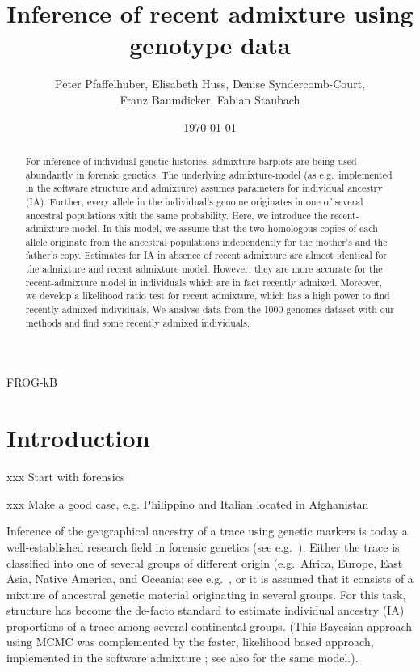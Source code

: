 \documentclass[12pt]{article}
\theoremstyle{definition}
\begin{document}
\title{\LARGE Inference of recent admixture using genotype data}

\author{\sc Peter Pfaffelhuber, Elisabeth Huss, Denise
  Syndercomb-Court, \\ \sc Franz Baumdicker, Fabian Staubach}

\date{\today}

\maketitle

FROG-kB




\begin{abstract}
  For inference of individual genetic histories, admixture barplots
  are being used abundantly in forensic genetics. The underlying
  admixture-model (as e.g.\ implemented in the software {\sc
    structure} and {\sc admixture}) assumes parameters for individual
  ancestry (IA). Further, every allele in the individual's genome
  originates in one of several ancestral populations with the same
  probability. Here, we introduce the recent-admixture model. In this
  model, we assume that the two homologous copies of each allele
  originate from the ancestral populations independently for the
  mother's and the father's copy. Estimates for IA in absence of
  recent admixture are almost identical for the admixture and recent
  admixture model. However, they are more accurate for the
  recent-admixture model in individuals which are in fact recently
  admixed.  Moreover, we develop a likelihood ratio test for recent
  admixture, which has a high power to find recently admixed
  individuals. We analyse data from the 1000 genomes dataset with our
  methods and find some recently admixed individuals.
\end{abstract}

\section{Introduction}
xxx Start with forensics

xxx Make a good case, e.g. Philippino and Italian located in
Afghanistan

Inference of the geographical ancestry of a trace using genetic
markers is today a well-established research field in forensic
genetics (see e.g.\ \cite{Phillips2016, Eduardoff2016,
  Kidd2017}). Either the trace is classified into one of several
groups of different origin (e.g.\ Africa, Europe, East Asia, Native
America, and Oceania; see e.g.\ \cite{Snipper2007, Pfaffelhuber2019},
or it is assumed that it consists of a mixture of ancestral genetic
material originating in several groups. For this task, {\sc structure}
\cite{Pritchard2000} has become the de-facto standard to estimate
individual ancestry (IA) proportions of a trace among several
continental groups. (This Bayesian approach using MCMC was
complemented by the faster, likelihood based approach, implemented in
the software {\sc admixture} \cite{Alexander2009}; see also
\cite{Tang2005} for the same model.).
\end{document}
